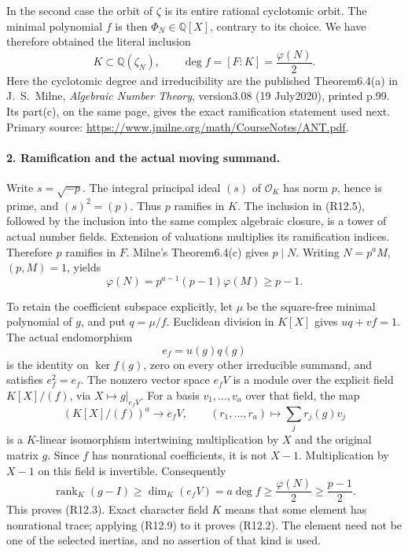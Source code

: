 In the second case the orbit of \(\zeta\) is its entire
rational cyclotomic orbit. The minimal polynomial \(f\) is
then \(\Phi_N\in\mathbb Q[X]\), contrary to its choice.
We have therefore obtained the literal inclusion
\[
                     K\subset\mathbb Q(\zeta_N),\qquad
                  \deg f=[F:K]=\frac{\varphi(N)}2.          \tag{R12.5}
\]
Here the cyclotomic degree and irreducibility are the published
Theorem6.4(a) in J.~S.~Milne, \emph{Algebraic Number Theory},
version3.08 (19 July2020), printed p.99. Its part(c), on the
same page, gives the exact ramification statement used next.
Primary source: \url{https://www.jmilne.org/math/CourseNotes/ANT.pdf}.

\paragraph{2. Ramification and the actual moving summand.}
Write \(s=\sqrt{-p}\). The integral principal ideal \((s)\)
of \(\mathcal O_K\) has norm \(p\), hence is prime, and
\((s)^2=(p)\). Thus \(p\) ramifies in \(K\). The inclusion
in (R12.5), followed by the inclusion into the same complex
algebraic closure, is a tower of actual number fields. Extension
of valuations multiplies its ramification indices. Therefore
\(p\) ramifies in \(F\). Milne's Theorem6.4(c) gives
\(p\mid N\). Writing \(N=p^aM\), \((p,M)=1\), yields
\[
         \varphi(N)=p^{a-1}(p-1)\varphi(M)\ge p-1.         \tag{R12.6}
\]

To retain the coefficient subspace explicitly, let \(\mu\)
be the square-free minimal polynomial of \(g\), and put
\(q=\mu/f\). Euclidean division in \(K[X]\) gives
\(u q+v f=1\). The actual endomorphism
\[
                     e_f=u(g)q(g)                         \tag{R12.7}
\]
is the identity on \(\ker f(g)\), zero on every other
irreducible summand, and satisfies \(e_f^2=e_f\).
The nonzero vector space \(e_fV\) is a module over the
explicit field \(K[X]/(f)\), via \(X\mapsto g|_{e_fV}\).
For a basis \(v_1,\ldots,v_a\) over that field, the map
\[
 (K[X]/(f))^a\longrightarrow e_fV,\qquad
      (r_1,\ldots,r_a)\longmapsto\sum_j r_j(g)v_j           \tag{R12.8}
\]
is a \(K\)-linear isomorphism intertwining multiplication
by \(X\) and the original matrix \(g\).
Since \(f\) has nonrational coefficients, it is not
\(X-1\). Multiplication by \(X-1\) on this field is
invertible. Consequently
\[
 \operatorname{rank}_K(g-I)\ge\dim_K(e_fV)
            =a\deg f\ge\frac{\varphi(N)}2\ge\frac{p-1}{2}.
                                                               \tag{R12.9}
\]
This proves (R12.3). Exact character field \(K\) means that
some element has nonrational trace; applying (R12.9) to it
proves (R12.2). The element need not be one of the selected
inertias, and no assertion of that kind is used.

